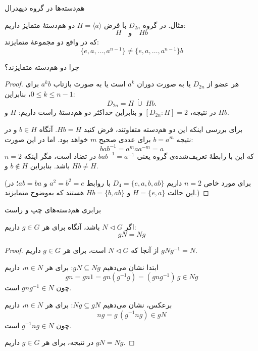 \begin{frame}[t]{هم‌دسته‌ها در گروه دیهدرال}

    \begin{example}
        مثال. در گروه $D_{2n}$ با فرض $H = \langle a \rangle$ دو هم‌دستهٔ متمایز داریم:
        \[
            H \quad \text{و} \quad Hb
        \]
        که در واقع دو مجموعهٔ متمایزند:
        \[
            \{e, a, \ldots, a^{n-1} \} \neq \{e, a, \ldots, a^{n-1} \}b
        \]
    \end{example}






\end{frame}
\begin{frame}[t]{چرا دو هم‌دسته متمایزند؟}
    \begin{proof}
        هر عضو از \(D_{2n}\) یا به صورت دوران \(a^k\) است یا به صورت بازتاب \(a^k b\) برای \(0\le k\le n-1\)، بنابراین:
        \[
            D_{2n}=H\;\dot\cup\;Hb.
        \]
        در نتیجه، \([D_{2n}:H]=2\) و بنابراین حداکثر دو هم‌دستهٔ راست داریم: \(H\) و \(Hb\).

        برای بررسی اینکه این دو هم‌دسته متفاوتند، فرض کنید \(Hb = H\). آنگاه \(b \in H\) و در نتیجه \(b = a^m\) برای عددی صحیح \(m\) خواهد بود. اما در این صورت:
        \[
            bab^{-1}=a^m a a^{-m}=a
        \]
        که این با رابطهٔ تعریف‌شده‌ی گروه یعنی \(bab^{-1} = a^{-1}\) در تضاد است، مگر اینکه \(n=2\) باشد. بنابراین \(b\notin H\) و \(Hb\ne H\).

        (برای مورد خاص \(n=2\) داریم \(D_4=\{e,a,b,ab\}\) با روابط \(a^2=b^2=e\) و \(ab=ba\)؛ در این حالت
        \(H=\{e,a\}\) و \(Hb=\{b,ab\}\) هستند که به‌وضوح متمایزند.)
    \end{proof}

\end{frame}

\begin{frame}[t]{برابری هم‌دسته‌های چپ و راست}
    \begin{lemma}
        اگر $N \triangleleft G$ باشد، آنگاه برای هر $g \in G$ داریم:
        \[
            gN = Ng
        \]
    \end{lemma}


    \begin{proof}
        از آنجا که \(N \triangleleft G\) است، برای هر \(g \in G\) داریم \(gNg^{-1} = N\).

        ابتدا نشان می‌دهیم \(gN \subseteq Ng\): برای هر \(n \in N\)، داریم
        \[
            gn = gn1 = gn(g^{-1}g) =(gng^{-1})\,g \in Ng
        \]
        چون \(gng^{-1} \in N\) است.

        برعکس، نشان می‌دهیم \(Ng \subseteq gN\): برای هر \(n \in N\)، داریم
        \[
            ng = g\,(g^{-1}ng) \in gN
        \]
        چون \(g^{-1}ng \in N\) است.

        در نتیجه، برای هر \(g \in G\) داریم \(gN = Ng\).
    \end{proof}
\end{frame}

